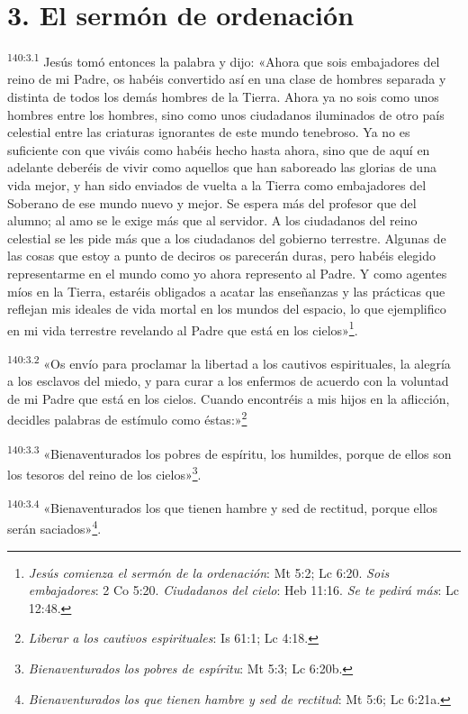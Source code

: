 \section*{3. El sermón de ordenación}
\par
\textsuperscript{140:3.1} Jesús tomó entonces la palabra y dijo: «Ahora que sois embajadores del reino de mi Padre, os habéis convertido así en una clase de hombres separada y distinta de todos los demás hombres de la Tierra. Ahora ya no sois como unos hombres entre los hombres, sino como unos ciudadanos iluminados de otro país celestial entre las criaturas ignorantes de este mundo tenebroso. Ya no es suficiente con que viváis como habéis hecho hasta ahora, sino que de aquí en adelante deberéis de vivir como aquellos que han saboreado las glorias de una vida mejor, y han sido enviados de vuelta a la Tierra como embajadores del Soberano de ese mundo nuevo y mejor. Se espera más del profesor que del alumno; al amo se le exige más que al servidor. A los ciudadanos del reino celestial se les pide más que a los ciudadanos del gobierno terrestre. Algunas de las cosas que estoy a punto de deciros os parecerán duras, pero habéis elegido representarme en el mundo como yo ahora represento al Padre. Y como agentes míos en la Tierra, estaréis obligados a acatar las enseñanzas y las prácticas que reflejan mis ideales de vida mortal en los mundos del espacio, lo que ejemplifico en mi vida terrestre revelando al Padre que está en los cielos»\footnote{\textit{Jesús comienza el sermón de la ordenación}: Mt 5:2; Lc 6:20. \textit{Sois embajadores}: 2 Co 5:20. \textit{Ciudadanos del cielo}: Heb 11:16. \textit{Se te pedirá más}: Lc 12:48.}.

\par
\textsuperscript{140:3.2} «Os envío para proclamar la libertad a los cautivos espirituales, la alegría a los esclavos del miedo, y para curar a los enfermos de acuerdo con la voluntad de mi Padre que está en los cielos. Cuando encontréis a mis hijos en la aflicción, decidles palabras de estímulo como éstas:»\footnote{\textit{Liberar a los cautivos espirituales}: Is 61:1; Lc 4:18.}

\par
\textsuperscript{140:3.3} «Bienaventurados los pobres de espíritu, los humildes, porque de ellos son los tesoros del reino de los cielos»\footnote{\textit{Bienaventurados los pobres de espíritu}: Mt 5:3; Lc 6:20b.}.

\par
\textsuperscript{140:3.4} «Bienaventurados los que tienen hambre y sed de rectitud, porque ellos serán saciados»\footnote{\textit{Bienaventurados los que tienen hambre y sed de rectitud}: Mt 5:6; Lc 6:21a.}.

